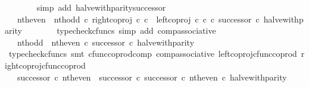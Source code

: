 \begin{isabellebody}
\ \ \ \ \ \ \isamarkupfalse%
\ {\isacharparenleft}{\kern0pt}simp\ add{\isacharcolon}{\kern0pt}\ halve{\isacharunderscore}{\kern0pt}with{\isacharunderscore}{\kern0pt}parity{\isacharunderscore}{\kern0pt}successor{\isacharparenright}{\kern0pt}\isanewline
\ \ \ \ \isamarkupfalse%
\ \isamarkupfalse%
\ {\isachardoublequoteopen}{\isachardot}{\kern0pt}{\isachardot}{\kern0pt}{\isachardot}{\kern0pt}\ {\isacharequal}{\kern0pt}\ {\isacharparenleft}{\kern0pt}nth{\isacharunderscore}{\kern0pt}even\ {\isasymamalg}\ nth{\isacharunderscore}{\kern0pt}odd\ {\isasymcirc}\isactrlsub c\ right{\isacharunderscore}{\kern0pt}coproj\ {\isasymnat}\isactrlsub c\ {\isasymnat}\isactrlsub c\ {\isasymamalg}\ {\isacharparenleft}{\kern0pt}left{\isacharunderscore}{\kern0pt}coproj\ {\isasymnat}\isactrlsub c\ {\isasymnat}\isactrlsub c\ {\isasymcirc}\isactrlsub c\ successor{\isacharparenright}{\kern0pt}{\isacharparenright}{\kern0pt}\ {\isasymcirc}\isactrlsub c\ halve{\isacharunderscore}{\kern0pt}with{\isacharunderscore}{\kern0pt}parity{\isachardoublequoteclose}\isanewline
\ \ \ \ \ \ \isamarkupfalse%
\ {\isacharparenleft}{\kern0pt}typecheck{\isacharunderscore}{\kern0pt}cfuncs{\isacharcomma}{\kern0pt}\ simp\ add{\isacharcolon}{\kern0pt}\ comp{\isacharunderscore}{\kern0pt}associative{}{\isacharparenright}{\kern0pt}\isanewline
\ \ \ \ \isamarkupfalse%
\ \isamarkupfalse%
\ {\isachardoublequoteopen}{\isachardot}{\kern0pt}{\isachardot}{\kern0pt}{\isachardot}{\kern0pt}\ {\isacharequal}{\kern0pt}\ nth{\isacharunderscore}{\kern0pt}odd\ {\isasymamalg}\ {\isacharparenleft}{\kern0pt}nth{\isacharunderscore}{\kern0pt}even\ {\isasymcirc}\isactrlsub c\ successor{\isacharparenright}{\kern0pt}\ {\isasymcirc}\isactrlsub c\ halve{\isacharunderscore}{\kern0pt}with{\isacharunderscore}{\kern0pt}parity{\isachardoublequoteclose}\isanewline
\ \ \ \ \ \ \isamarkupfalse%
\ {\isacharparenleft}{\kern0pt}typecheck{\isacharunderscore}{\kern0pt}cfuncs{\isacharcomma}{\kern0pt}\ smt\ cfunc{\isacharunderscore}{\kern0pt}coprod{\isacharunderscore}{\kern0pt}comp\ comp{\isacharunderscore}{\kern0pt}associative{}\ left{\isacharunderscore}{\kern0pt}coproj{\isacharunderscore}{\kern0pt}cfunc{\isacharunderscore}{\kern0pt}coprod\ right{\isacharunderscore}{\kern0pt}coproj{\isacharunderscore}{\kern0pt}cfunc{\isacharunderscore}{\kern0pt}coprod{\isacharparenright}{\kern0pt}\isanewline
\ \ \ \ \isamarkupfalse%
\ \isamarkupfalse%
\ {\isachardoublequoteopen}{\isachardot}{\kern0pt}{\isachardot}{\kern0pt}{\isachardot}{\kern0pt}\ {\isacharequal}{\kern0pt}\ {\isacharparenleft}{\kern0pt}successor\ {\isasymcirc}\isactrlsub c\ nth{\isacharunderscore}{\kern0pt}even{\isacharparenright}{\kern0pt}\ {\isasymamalg}\ {\isacharparenleft}{\kern0pt}{\isacharparenleft}{\kern0pt}successor\ {\isasymcirc}\isactrlsub c\ successor{\isacharparenright}{\kern0pt}\ {\isasymcirc}\isactrlsub c\ nth{\isacharunderscore}{\kern0pt}even{\isacharparenright}{\kern0pt}\ {\isasymcirc}\isactrlsub c\ halve{\isacharunderscore}{\kern0pt}with{\isacharunderscore}{\kern0pt}parity{\isachardoublequoteclose}\isanewline

\end{isabellebody}
